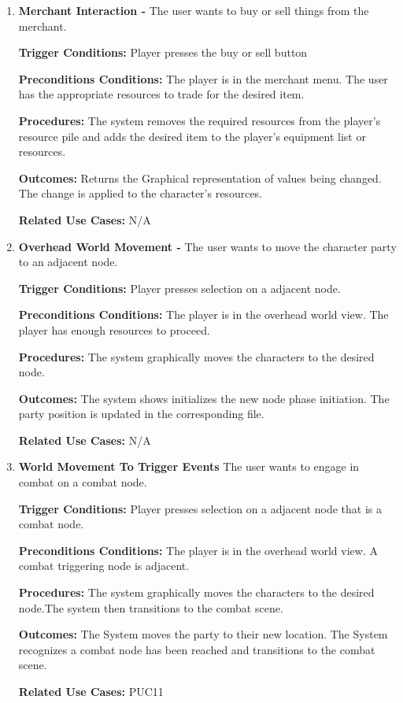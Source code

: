 \documentclass{article}
\begin{document}
\begin{enumerate}[{PUC}1. ]
	\item \textbf{Merchant Interaction -} The user wants to buy or sell things from the merchant. \par
\textbf{Trigger Conditions: }Player presses the buy or sell button \par
\textbf{Preconditions Conditions: }The player is in the merchant menu. The user has the appropriate resources to trade for the desired item.\par
\textbf{Procedures: }The system removes the required resources from the player's resource pile and adds the desired item to the player's equipment list or resources. \par
\textbf{Outcomes: }Returns the Graphical representation of values being changed. The change is applied to the character's resources. \par
\textbf{Related Use Cases: }N/A \par

	\item \textbf{Overhead World Movement -} The user wants to move the character party to an adjacent node. \par
\textbf{Trigger Conditions: }Player presses selection on a adjacent node. \par
\textbf{Preconditions Conditions: }The player is in the overhead world view. The player has enough resources to proceed.\par
\textbf{Procedures: }The system graphically moves the characters to the desired node. \par
\textbf{Outcomes: }The system shows initializes the new node phase initiation. The party position is updated in the corresponding file. \par
\textbf{Related Use Cases: }N/A \par

	\item \textbf{World Movement To Trigger Events} The user wants to engage in combat on a combat node. \par
\textbf{Trigger Conditions: }Player presses selection on a adjacent node that is a combat node. \par
\textbf{Preconditions Conditions: }The player is in the overhead world view. A combat triggering node is adjacent.\par
\textbf{Procedures: }The system graphically moves the characters to the desired node.The system then transitions to the combat scene. \par
\textbf{Outcomes: }The System moves the party to their new location. The System recognizes a combat node has been reached and transitions to the combat scene. \par
\textbf{Related Use Cases: }PUC11 \par

\end{enumerate}
\end{document}
